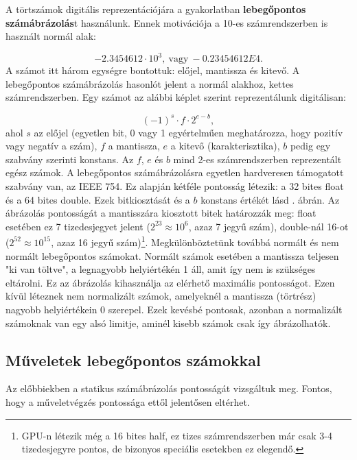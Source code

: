 \documentclass[12pt]{article}
\theoremstyle{plain}
\begin{document}
A törtszámok digitális reprezentációjára a gyakorlatban \textbf{lebegőpontos számábrázolás}t használunk. Ennek motivációja a 10-es számrendszerben is használt normál alak:

\begin{equation}
	-2.3454612 \cdot 10^3, ~\mathrm{vagy} ~ -0.23454612E4.
\end{equation}
A számot itt három egységre bontottuk: előjel, mantissza és kitevő. A lebegőpontos számábrázolás hasonlót jelent a normál alakhoz, kettes számrendszerben. Egy számot az alábbi képlet szerint reprezentálunk digitálisan:

\begin{equation}
	(-1)^s \cdot f \cdot 2^{e-b},
\end{equation}
ahol $s$ az előjel (egyetlen bit, 0 vagy 1 egyértelműen meghatározza, hogy pozitív vagy negatív a szám), $f$ a mantissza, $e$ a kitevő (karakterisztika), $b$ pedig egy szabvány szerinti konstans. Az $f$, $e$ és $b$ mind 2-es számrendszerben reprezentált egész számok. A lebegőpontos számábrázolásra egyetlen hardveresen támogatott szabvány van, az IEEE 754. Ez alapján kétféle pontosság létezik: a 32 bites float és a 64 bites double. Ezek bitkiosztását és a $b$ konstans értékét lásd . ábrán. Az ábrázolás pontosságát a mantisszára kiosztott bitek határozzák meg: float esetében ez 7 tizedesjegyet jelent ($2^{23} \approx 10^6$, azaz 7 jegyű szám), double-nál 16-ot ($2^{52} \approx 10^{15}$, azaz 16 jegyű szám)\footnote{GPU-n létezik még a 16 bites half, ez tizes számrendszerben már csak 3-4 tizedesjegyre pontos, de bizonyos speciális esetekben ez elegendő.}. Megkülönböztetünk továbbá normált és nem normált lebegőpontos számokat. Normált számok esetében a mantissza teljesen "ki van töltve", a legnagyobb helyiértékén 1 áll, amit így nem is szükséges eltárolni. Ez az ábrázolás kihasználja az elérhető maximális pontosságot. Ezen kívül léteznek nem normalizált számok, amelyeknél a mantissza (törtrész) nagyobb helyiértékein 0 szerepel. Ezek kevésbé pontosak, azonban a normalizált számoknak van egy alsó limitje, aminél kisebb számok csak így ábrázolhatók.


\subsection{Műveletek lebegőpontos számokkal}

Az előbbiekben a statikus számábrázolás pontosságát vizsgáltuk meg. Fontos, hogy a műveletvégzés pontossága ettől jelentősen eltérhet.
\end{document}

